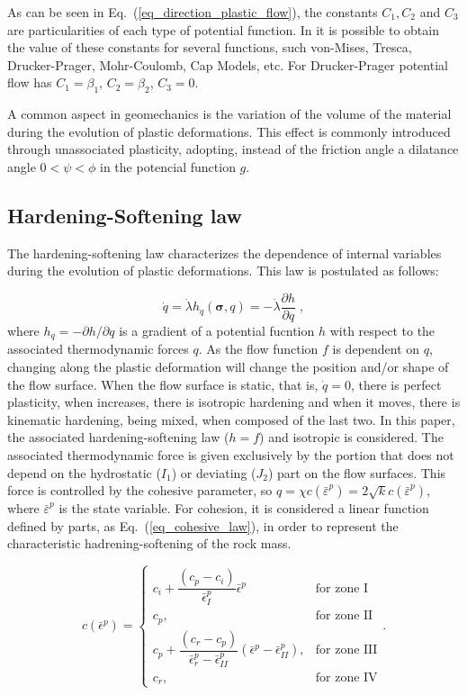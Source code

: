 \documentclass[Journal,letterpaper]{ascelike-new}
\newcommand{\hl}{{h_q}}
\newcommand{\strainpeq}{\bar \varepsilon^p}
\newcommand{\stress}{\boldsymbol{\sigma}}
\begin{document}
As can be seen in Eq.~(\ref{eq_direction_plastic_flow}), the constants $C_1, C_2$ and $C_3$ are particularities of each type of potential function. In  it is possible to obtain the value of these constants for several functions, such von-Mises, Tresca, Drucker-Prager, Mohr-Coulomb, Cap Models, etc. For Drucker-Prager potential flow has $C_1 = \beta_1$, $C_2 = \beta_2$, $C_3 = 0$.

A common aspect in geomechanics is the variation of the volume of the material during the evolution of plastic deformations. This effect is commonly introduced through unassociated plasticity, adopting, instead of the friction angle a dilatance angle $0<\psi<\phi$ in the potencial function $g$.

\subsection{Hardening-Softening law}

The hardening-softening law characterizes the dependence of internal variables during the evolution of plastic deformations. This law is postulated as follows:

\begin{equation} \label{eq_hardening_law}
	\dot q = \dot \lambda \hl(\stress,q) = - \dot \lambda \dfrac{\partial h}{\partial q}\;,
\end{equation}
where $\hl = -\partial h / \partial q$ is a gradient of a potential fucntion $h$ with respect to the associated thermodynamic forces $q$. As the flow function $f$ is dependent on $q$, changing along the plastic deformation will change the position and/or shape of the flow surface. When the flow surface is static, that is, $\dot q = 0$, there is perfect plasticity, when increases, there is isotropic hardening and when it moves, there is kinematic hardening, being mixed, when composed of the last two. In this paper, the associated hardening-softening law ($h=f$) and isotropic is considered. The associated thermodynamic force is given exclusively by the portion that does not depend on the hydrostatic ($I_1$) or deviating ($J_2$) part on the flow surfaces. This force is controlled by the cohesive parameter, so $q = \chi c(\strainpeq) = 2\sqrt{k}c(\strainpeq)$, where $\strainpeq$ is the state variable. For cohesion, it is considered a linear function defined by parts, as Eq.~(\ref{eq_cohesive_law}), in order to represent the characteristic hadrening-softening of the rock mass.

\begin{equation} \label{eq_cohesive_law}
c (\bar \epsilon^p) = \left\{ 
\begin{array}{ll} 
	c_i + \dfrac{(c_p-c_i)}{\bar \epsilon^p_I}\bar \epsilon^p &  \text{for zone I} \\ 
	c_p, & \text{for zone II} \\
	c_p + \dfrac{(c_r-c_p)}{\bar \epsilon^p_r-\bar \epsilon^p_{II}}(\bar \epsilon^p - \bar \epsilon^p_{II}), & \text{for zone III} \\	
	c_r, & \text{for zone IV}
\end{array}\right..
\end{equation}
\end{document}
